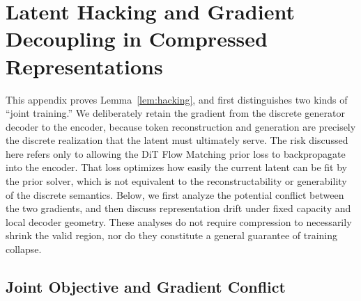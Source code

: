 \section{Latent Hacking and Gradient Decoupling in Compressed Representations}
\label{app:hacking}

This appendix proves Lemma~\ref{lem:hacking}, and first distinguishes two kinds of ``joint training.'' We deliberately retain the gradient from the discrete generator decoder to the encoder, because token reconstruction and generation are precisely the discrete realization that the latent must ultimately serve. The risk discussed here refers only to allowing the DiT Flow Matching prior loss to backpropagate into the encoder. That loss optimizes how easily the current latent can be fit by the prior solver, which is not equivalent to the reconstructability or generability of the discrete semantics. Below, we first analyze the potential conflict between the two gradients, and then discuss representation drift under fixed capacity and local decoder geometry. These analyses do not require compression to necessarily shrink the valid region, nor do they constitute a general guarantee of training collapse.

\subsection{Joint Objective and Gradient Conflict}

